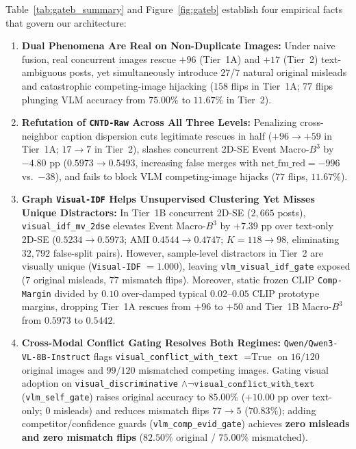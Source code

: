 Table~\ref{tab:gateb_summary} and Figure~\ref{fig:gateb} establish four empirical facts that govern our architecture:
\begin{enumerate}
    \item \textbf{Dual Phenomena Are Real on Non-Duplicate Images:} Under naive fusion, real concurrent images rescue $+96$ (Tier~1A) and $+17$ (Tier~2) text-ambiguous posts, yet simultaneously introduce $27$/$7$ natural original misleads and catastrophic competing-image hijacking ($158$ flips in Tier~1A; $77$ flips plunging VLM accuracy from $75.00\%$ to $11.67\%$ in Tier~2).
    \item \textbf{Refutation of \texttt{CNTD-Raw} Across All Three Levels:} Penalizing cross-neighbor caption dispersion cuts legitimate rescues in half ($+96 \to +59$ in Tier~1A; $17 \to 7$ in Tier~2), slashes concurrent 2D-SE Event Macro-$B^3$ by $-4.80\text{ pp}$ ($0.5973 \to 0.5493$, increasing false merges with $\text{net\_fm\_red} = -996$ vs.\ $-38$), and fails to block VLM competing-image hijacks ($77$ flips, $11.67\%$).
    \item \textbf{Graph \texttt{Visual-IDF} Helps Unsupervised Clustering Yet Misses Unique Distractors:} In Tier~1B concurrent 2D-SE ($2{,}665$ posts), \texttt{visual\_idf\_mv\_2dse} elevates Event Macro-$B^3$ by $+7.39\text{ pp}$ over text-only 2D-SE ($0.5234 \to 0.5973$; AMI $0.4544 \to 0.4747$; $K=118 \to 98$, eliminating $32{,}792$ false-split pairs). However, sample-level distractors in Tier~2 are visually unique (\texttt{Visual-IDF} $= 1.000$), leaving \texttt{vlm\_visual\_idf\_gate} exposed ($7$ original misleads, $77$ mismatch flips). Moreover, static frozen CLIP \texttt{Comp-Margin} divided by $0.10$ over-damped typical $0.02$--$0.05$ CLIP prototype margins, dropping Tier~1A rescues from $+96$ to $+50$ and Tier~1B Macro-$B^3$ from $0.5973$ to $0.5442$.
    \item \textbf{Cross-Modal Conflict Gating Resolves Both Regimes:} \texttt{Qwen/Qwen3-VL-8B-Instruct} flags \texttt{visual\_conflict\_with\_text} $= \text{True}$ on $16/120$ original images and $99/120$ mismatched competing images. Gating visual adoption on \texttt{visual\_discriminative} $\wedge \neg\texttt{visual\_conflict\_with\_text}$ (\texttt{vlm\_self\_gate}) raises original accuracy to $85.00\%$ ($+10.00\text{ pp}$ over text-only; $0$ misleads) and reduces mismatch flips $77 \to 5$ ($70.83\%$); adding competitor/confidence guards (\texttt{vlm\_comp\_evid\_gate}) achieves \textbf{zero misleads and zero mismatch flips} ($82.50\%$ original / $75.00\%$ mismatched).
\end{enumerate}

